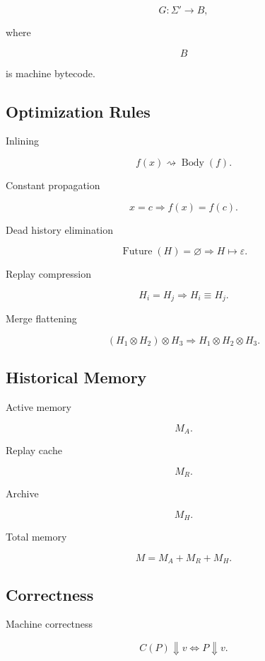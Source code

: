 \documentclass[12pt,oneside]{article}
\theoremstyle{definition}
\theoremstyle{remark}
\begin{document}
\[
G
:
\Sigma'
\rightarrow
B,
\]

where

\[
B
\]

is machine bytecode.

\subsection*{Optimization Rules}

Inlining

\[
f(x)
\rightsquigarrow
\operatorname{Body}(f).
\]

Constant propagation

\[
x=c
\Longrightarrow
f(x)
=
f(c).
\]

Dead history elimination

\[
\operatorname{Future}(H)
=
\varnothing
\Longrightarrow
H
\mapsto
\varepsilon.
\]

Replay compression

\[
H_i
=
H_j
\Longrightarrow
H_i
\equiv
H_j.
\]

Merge flattening

\[
(H_1\otimes H_2)\otimes H_3
\Longrightarrow
H_1\otimes H_2\otimes H_3.
\]

\subsection*{Historical Memory}

Active memory

\[
M_A.
\]

Replay cache

\[
M_R.
\]

Archive

\[
M_H.
\]

Total memory

\[
M
=
M_A
+
M_R
+
M_H.
\]

\subsection*{Correctness}

Machine correctness

\[
C(P)
\Downarrow
v
\Longleftrightarrow
P
\Downarrow
v.
\]
\end{document}
